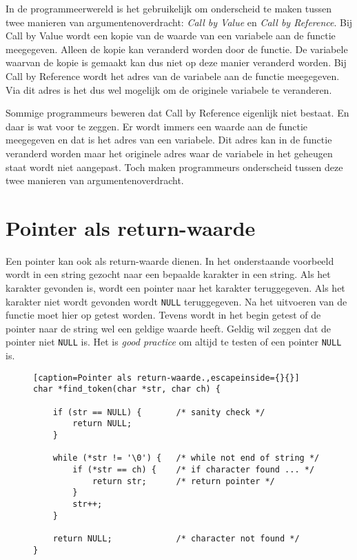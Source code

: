 \begin{infobox}
In de programmeerwereld is het gebruikelijk om onderscheid te maken tussen twee manieren van argumentenoverdracht: \textsl{Call by Value} en \textsl{Call by Reference}. Bij Call by Value wordt een kopie van de waarde van een variabele aan de functie meegegeven. Alleen de kopie kan veranderd worden door de functie. De variabele waarvan de kopie is gemaakt kan dus niet op deze manier veranderd worden. Bij Call by Reference wordt het adres van de variabele aan de functie meegegeven. Via dit adres is het dus wel mogelijk om de originele variabele te veranderen.

Sommige programmeurs beweren dat Call by Reference eigenlijk niet bestaat. En daar is wat voor te zeggen. Er wordt immers een waarde aan de functie meegegeven en dat is het adres van een variabele. Dit adres kan in de functie veranderd worden maar het originele adres waar de variabele in het geheugen staat wordt niet aangepast. Toch maken programmeurs onderscheid tussen deze twee manieren van argumentenoverdracht.
\end{infobox}

\section{Pointer als return-waarde}
\label{sec:pointersalsreturnwaarde}
Een pointer kan ook als return-waarde dienen. In het onderstaande voorbeeld wordt in een string gezocht naar een bepaalde karakter in een string. Als het karakter gevonden is, wordt een pointer naar het karakter teruggegeven. Als het karakter niet wordt gevonden wordt \texttt{NULL} teruggegeven. Na het uitvoeren van de functie moet hier op getest worden. Tevens wordt in het begin getest of de pointer naar de string wel een geldige waarde heeft. Geldig wil zeggen dat de pointer niet \texttt{NULL} is. Het is \textsl{good practice} om altijd te testen of een pointer \texttt{NULL} is.

\begin{figure}[!ht]
\begin{lstlisting}[caption=Pointer als return-waarde.,escapeinside={}{}]
char *find_token(char *str, char ch) {

    if (str == NULL) {       /* sanity check */
        return NULL;
    }

    while (*str != '\0') {   /* while not end of string */
        if (*str == ch) {    /* if character found ... */
            return str;      /* return pointer */
        }
        str++;
    }

    return NULL;             /* character not found */
}
\end{lstlisting}
\end{figure}

